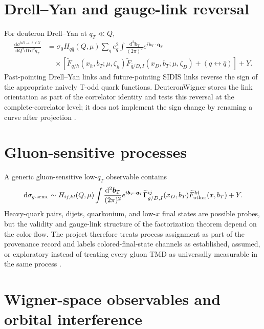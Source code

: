 \documentclass[11pt,oneside]{book}
\newcommand{\bT}{\bm{b}_{T}}
\newcommand{\dd}{\mathrm{d}}
\begin{document}
\section{Drell--Yan and gauge-link reversal}

For deuteron Drell--Yan at $q_T\ll Q$,
\begin{align}
 \frac{\dd\sigma^{hD\to\ell\ell X}}
      {\dd Q^2\dd Y\dd^2q_T}
 &=\sigma_0 H_{q\bar q}(Q,\mu)
 \sum_q e_q^2\int\frac{\dd^2\bT}{(2\pi)^2}
 e^{i\bT\cdot\bm q_T}
 \nonumber\\
 &\quad\times
 \left[
 \widetilde F_{q/h}(x_h,b_T;\mu,\zeta_h)
 \widetilde F_{\bar q/D,I}(x_D,b_T;\mu,\zeta_D)
 +(q\leftrightarrow\bar q)
 \right]+Y.
 \label{eq:dy-factorized}
\end{align}
Past-pointing Drell--Yan links and future-pointing SIDIS links reverse the sign of the appropriate naively T-odd quark functions.  DeuteronWigner stores the link orientation as part of the correlator identity and tests this reversal at the complete-correlator level; it does not implement the sign change by renaming a curve after projection \cite{BrodskyHwangSchmidt2002,Collins2002SignChange,BoerMuldersPijlman2003,BomhofMuldersPijlman2004}.

\section{Gluon-sensitive processes}

A generic gluon-sensitive low-$q_T$ observable contains
\begin{equation}
 \dd\sigma_{g\text{-sens.}}
 \sim H_{ij,kl}(Q,\mu)
 \int\frac{\dd^2\bT}{(2\pi)^2}e^{i\bT\cdot\bm q_T}
 \widetilde\Gamma_{g/D,I}^{ij}(x_D,b_T)
 \widetilde F_{\rm other}^{kl}(x,b_T)+Y.
 \label{eq:gluon-sensitive}
\end{equation}
Heavy-quark pairs, dijets, quarkonium, and low-$x$ final states are possible probes, but the validity and gauge-link structure of the factorization theorem depend on the color flow.  The project therefore treats process assignment as part of the provenance record and labels colored-final-state channels as established, assumed, or exploratory instead of treating every gluon TMD as universally measurable in the same process \cite{BoerEtAl2016,BuffingMukherjeeMulders2013,Collins2011}.

\section{Wigner-space observables and orbital interference}
\end{document}
